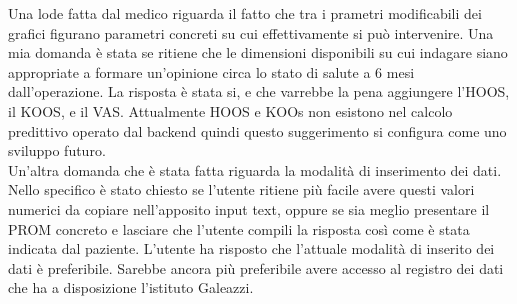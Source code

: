 Una lode fatta dal medico riguarda il fatto che tra i prametri modificabili dei grafici figurano parametri concreti su cui effettivamente si può intervenire. Una mia domanda è stata se ritiene che le dimensioni disponibili su cui indagare siano appropriate a formare un'opinione circa lo stato di salute a 6 mesi dall'operazione. La risposta è stata si, e che varrebbe la pena aggiungere l'HOOS, il KOOS, e il VAS. Attualmente HOOS e KOOs non esistono nel calcolo predittivo operato dal backend quindi questo suggerimento si configura come uno sviluppo futuro. \\
Un'altra domanda che è stata fatta riguarda la modalità di inserimento dei dati. Nello specifico è stato chiesto se l'utente ritiene più facile avere questi valori numerici da copiare nell'apposito input text, oppure se sia meglio presentare il PROM concreto e lasciare che l'utente compili la risposta così come è stata indicata dal paziente. L'utente ha risposto che l'attuale modalità di inserito dei dati è preferibile. Sarebbe ancora più preferibile avere accesso al registro dei dati che ha a disposizione l'istituto Galeazzi. 